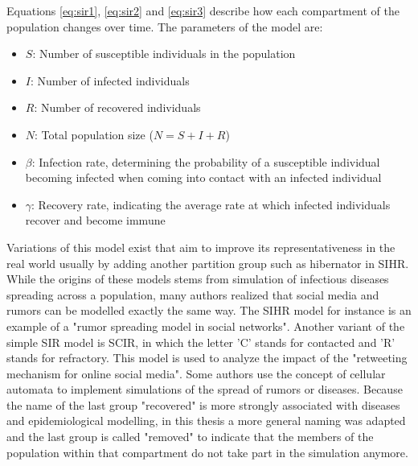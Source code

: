 Equations \ref{eq:sir1}, \ref{eq:sir2} and \ref{eq:sir3} describe how each compartment of the population changes over time.
The parameters of the model are:

\begin{itemize}
    \item $S$: Number of susceptible individuals in the population
    \item $I$: Number of infected individuals
    \item $R$: Number of recovered individuals
    \item $N$: Total population size ($N = S + I + R$)
    \item $\beta$: Infection rate, determining the probability of a susceptible individual becoming infected when coming into contact with an infected individual
    \item $\gamma$: Recovery rate, indicating the average rate at which infected individuals recover and become immune
\end{itemize}

Variations of this model exist that aim to improve its representativeness in the real world usually by adding another partition group such as hibernator in SIHR\cite{zhao2012sihr}.
While the origins of these models stems from simulation of infectious diseases spreading across a population, many authors realized that social media and rumors can be modelled exactly the same way.
The SIHR model for instance is an example of a "rumor spreading model in social networks"\cite{zhao2012sihr}.
Another variant of the simple SIR model is SCIR, in which the letter 'C' stands for contacted and 'R' stands for refractory.
This model is used to analyze the impact of the "retweeting mechanism for online social media"\cite{xiong2012scir}.
Some authors use the concept of cellular automata to implement simulations of the spread of rumors or diseases\cite{silva2020}.
Because the name of the last group "recovered" is more strongly associated with diseases and epidemiological modelling, in this thesis a more general naming was adapted and the last group is called "removed" to indicate that the members of the population within that compartment do not take part in the simulation anymore.

